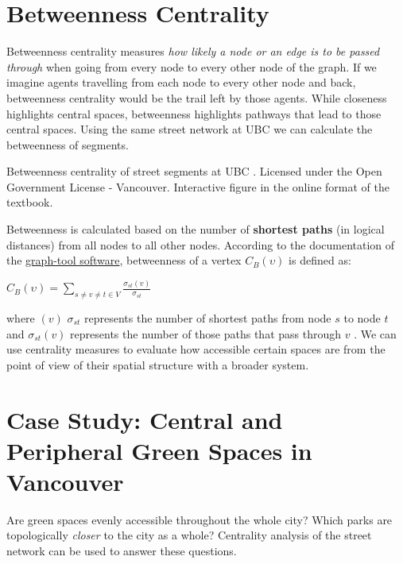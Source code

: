 \documentclass[
]{book}
\begin{document}
\hypertarget{betweenness-centrality}{%
\section{Betweenness Centrality}\label{betweenness-centrality}}

Betweenness centrality measures \emph{how likely a node or an edge is to be passed through} when going from every node to every other node of the graph. If we imagine agents travelling from each node to every other node and back, betweenness centrality would be the trail left by those agents. While closeness highlights central spaces, betweenness highlights pathways that lead to those central spaces. Using the same street network at UBC we can calculate the betweenness of segments.

\label{fig:8-betweenness-centrality}Betweenness centrality of street segments at UBC \citep{city_of_vancouver_open_nodate}. Licensed under the Open Government License - Vancouver. Interactive figure in the online format of the textbook.

Betweenness is calculated based on the number of \textbf{shortest paths} (in logical distances) from all nodes to all other nodes. According to the documentation of the \href{https://graph-tool.skewed.de/static/doc/centrality.html}{graph-tool software}, betweenness of a vertex \(C_{B}(\upsilon)\) is defined as:

\(C_{B}(\upsilon) = \sum\limits_{s \neq v \neq t \in V} \frac {\sigma_{st}(v)}{\sigma_{st}}\)

where \((v)\) \({\sigma_{st}}\) represents the number of shortest paths from node \(s\) to node \(t\) and \({\sigma_{st}(v)}\) represents the number of those paths that pass through \(v\) \citep{graph-tool_centrality_nodate}. We can use centrality measures to evaluate how accessible certain spaces are from the point of view of their spatial structure with a broader system.

\hypertarget{case-study-central-and-peripheral-green-spaces-in-vancouver}{%
\section{Case Study: Central and Peripheral Green Spaces in Vancouver}\label{case-study-central-and-peripheral-green-spaces-in-vancouver}}

Are green spaces evenly accessible throughout the whole city? Which parks are topologically \emph{closer} to the city as a whole? Centrality analysis of the street network can be used to answer these questions.
\end{document}
